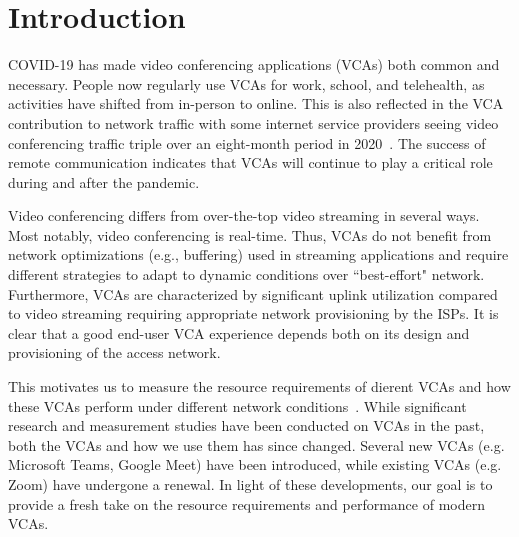 \section{Introduction}\label{sec:intro}
COVID-19 has made video conferencing applications (VCAs) both common and necessary. People now regularly use VCAs for work, school, and telehealth, as activities have shifted from in-person to online. This is also reflected in the VCA contribution to network traffic with some internet service providers seeing video conferencing traffic triple over an eight-month period in 2020~\cite{bitag_report}. The success of remote communication indicates that VCAs will continue to play a critical role during and after the pandemic. 



Video conferencing differs from over-the-top video streaming in several ways. Most notably, video conferencing is real-time. Thus, VCAs do not benefit from network optimizations (e.g., buffering) used in streaming applications and require different strategies to adapt to dynamic conditions over ``best-effort" network. Furthermore, VCAs are characterized by significant uplink utilization compared to video streaming requiring appropriate network provisioning by the ISPs. It is clear that a good end-user VCA experience depends both on its design and provisioning of the access network.   %

This motivates us to measure the resource requirements of dierent VCAs and how these VCAs perform under different network conditions~\cite{guha2005experimental, baset2004analysis, bonfiglio2008detailed, bonfiglio2008tracking, xu2012video}. 
While significant research and measurement studies have been conducted on VCAs in the past, both the VCAs and how we use them has since changed. Several new VCAs (e.g. Microsoft Teams, Google Meet) have been introduced, while existing VCAs (e.g. Zoom) have undergone a renewal. In light of these developments, our goal is to provide a fresh take on the resource requirements and performance of modern VCAs. 


